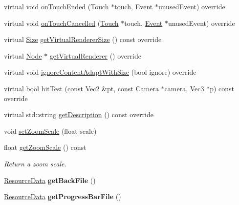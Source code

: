 \begin{DoxyCompactItemize}
virtual void \hyperlink{classui_1_1Slider_afeaab747b9a9b3a71ebc77ff21e86008}{on\+Touch\+Ended} (\hyperlink{classTouch}{Touch} $\ast$touch, \hyperlink{classEvent}{Event} $\ast$unused\+Event) override
\item 
virtual void \hyperlink{classui_1_1Slider_aefedbd6e07e51892ed7d82489d600658}{on\+Touch\+Cancelled} (\hyperlink{classTouch}{Touch} $\ast$touch, \hyperlink{classEvent}{Event} $\ast$unused\+Event) override
\item 
virtual \hyperlink{classSize}{Size} \hyperlink{classui_1_1Slider_a70a4f1507c4a95f317368512098959da}{get\+Virtual\+Renderer\+Size} () const override
\item 
virtual \hyperlink{classNode}{Node} $\ast$ \hyperlink{classui_1_1Slider_a801fd6363b412ecc766abe2eea7924b6}{get\+Virtual\+Renderer} () override
\item 
virtual void \hyperlink{classui_1_1Slider_aa99728d692807df976fa1be592a2838d}{ignore\+Content\+Adapt\+With\+Size} (bool ignore) override
\item 
virtual bool \hyperlink{classui_1_1Slider_a2b702f67e7e217bac4c618ed0fe36d7a}{hit\+Test} (const \hyperlink{classVec2}{Vec2} \&pt, const \hyperlink{classCamera}{Camera} $\ast$camera, \hyperlink{classVec3}{Vec3} $\ast$p) const override
\item 
virtual std\+::string \hyperlink{classui_1_1Slider_a8267160a9d513ad4761eb916a76223ec}{get\+Description} () const override
\item 
void \hyperlink{classui_1_1Slider_ac24c9f8e9eb7431468ed0b9606e420b9}{set\+Zoom\+Scale} (float scale)
\item 
float \hyperlink{classui_1_1Slider_abaeae39d3a0da8594d6e3a699c7a3ced}{get\+Zoom\+Scale} () const
\begin{DoxyCompactList}\small\item\em Return a zoom scale. \end{DoxyCompactList}\item 
\mbox{\label{classui_1_1Slider_a4899554a3633b9c1a787f8cd2f6bdbb0}} 
\hyperlink{structResourceData}{Resource\+Data} {\bfseries get\+Back\+File} ()
\item 
\mbox{\label{classui_1_1Slider_a1fdb80936ca776de8b4495f1548b667f}} 
\hyperlink{structResourceData}{Resource\+Data} {\bfseries get\+Progress\+Bar\+File} ()
\item 
\mbox{\label{classui_1_1Slider_a154ae03327b5f3950bc426444a6597f7}} 

\end{DoxyCompactItemize}
